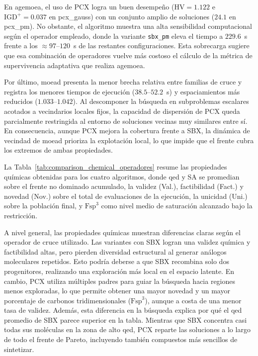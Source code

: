 En \acrshort{agemoea}, el uso de PCX logra un buen desempeño ($\text{HV} = 1.122$ e $\text{IGD}^+ = 0.037$ en pcx\_gauss) con un conjunto amplio de soluciones ($24.1$ en pcx\_pm). No obstante, el algoritmo muestra una alta sensibilidad computacional según el operador empleado, donde la variante \texttt{sbx\_pm} eleva el tiempo a $229.6$~s frente a los $\approx 97\text{--}120$~s de las restantes configuraciones. Esta sobrecarga sugiere que esa combinación de operadores vuelve más costoso el cálculo de la métrica de supervivencia adaptativa que realiza \acrshort{agemoea}.

Por último, \acrshort{moead} presenta la menor brecha relativa entre familias de cruce y registra los menores tiempos de ejecución ($38.5\text{--}52.2$~s) y espaciamientos más reducidos ($1.033\text{--}1.042$). Al descomponer la búsqueda en subproblemas escalares acotados a vecindarios locales fijos, la capacidad de dispersión de PCX queda parcialmente restringida al entorno de soluciones vecinas muy similares entre sí. En consecuencia, aunque PCX mejora la cobertura frente a SBX, la dinámica de vecindad de \acrshort{moead} prioriza la explotación local, lo que impide que el frente cubra los extremos de ambas propiedades.

La Tabla~\ref{tab:comparison_chemical_operadores} resume las propiedades químicas obtenidas para los cuatro algoritmos, donde \gls{qed} y SA se promedian sobre el frente no dominado acumulado, la validez (Val.), factibilidad (Fact.) y novedad (Nov.) sobre el total de evaluaciones de la ejecución, la unicidad (Uni.) sobre la población final, y $\text{Fsp}^3$ como nivel medio de saturación alcanzado bajo la restricción.



A nivel general, las propiedades químicas muestran diferencias claras según el operador de cruce utilizado. Las variantes con SBX logran una validez química y factibilidad altas, pero pierden diversidad estructural al generar análogos moleculares repetidos. Esto podría deberse a que SBX recombina solo dos progenitores, realizando una exploración más local en el espacio latente. En cambio, PCX utiliza múltiples padres para guiar la búsqueda hacia regiones menos exploradas, lo que permite obtener una mayor novedad y un mayor porcentaje de carbonos tridimensionales ($\text{Fsp}^3$), aunque a costa de una menor tasa de validez. Además, esta diferencia en la búsqueda explica por qué el \gls{qed} promedio de SBX parece superior en la tabla. Mientras que SBX concentra casi todas sus moléculas en la zona de alto \gls{qed}, PCX reparte las soluciones a lo largo de todo el frente de Pareto, incluyendo también compuestos más sencillos de sintetizar.

